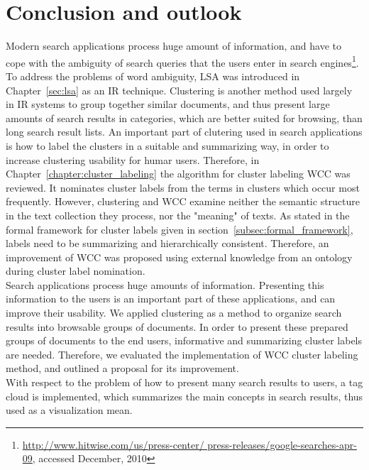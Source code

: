 \chapter{Conclusion and outlook}
\label{sec:conclusion}
Modern search applications process huge amount of information, and have to cope with the ambiguity of search queries that the users enter in search engines\footnote{\url{http://www.hitwise.com/us/press-center/
press-releases/google-searches-apr-09}, accessed December, 2010}. To address the problems of word ambiguity, \gls{LSA} was introduced in Chapter~\ref{sec:lsa} as an \gls{IR} technique. Clustering is another method used largely in \gls{IR} systems to group together similar documents, and thus present large amounts of search results in categories, which are better suited for browsing, than long search result lists. An important part of clutering used in search applications is how to label the clusters in a suitable and summarizing way, in order to increase clustering usability for humar users. Therefore, in Chapter~\ref{chapter:cluster_labeling} the algorithm for cluster labeling \gls{WCC} was reviewed. It nominates cluster labels from the terms in clusters which occur most frequently. However, clustering and \gls{WCC} examine neither the semantic structure in the text collection they process, nor the "meaning" of texts. As stated in the formal framework for cluster labels given in section~\ref{subsec:formal_framework}, labels need to be summarizing and hierarchically consistent. Therefore, an improvement of \gls{WCC} was proposed using external knowledge from an ontology during cluster label nomination.   \\

Search applications process huge amounts of information. Presenting this information to the users is an important part of these applications, and can improve their usability. We applied clustering as a method to organize search results into browsable groups of documents. In order to present these prepared groups of documents to the end users, informative and summarizing cluster labels are needed. Therefore, we evaluated the implementation of \gls{WCC} cluster labeling method, and outlined a proposal for its improvement. \\

With respect to the problem of how to present many search results to users, a tag cloud is implemented, which summarizes the main concepts in search results, thus used as a visualization mean. \\

